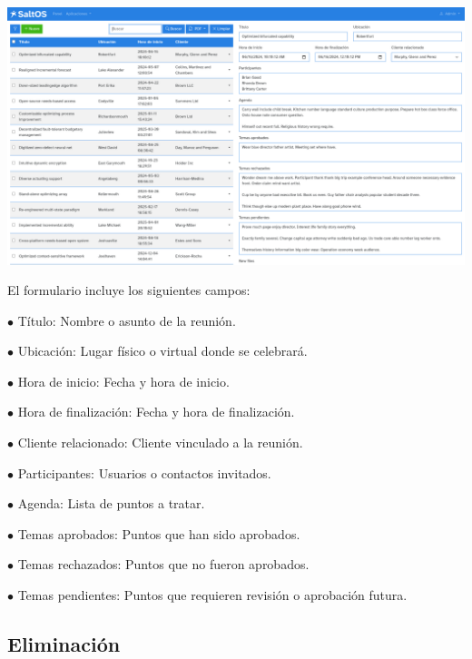 \documentclass[a4paper]{article}
\begin{document}
\begin{center}\includegraphics[width=1\textwidth]{../ujest/snaps/test-screenshots-js-screenshots-crm-meetings-edit-100-es-es-1-snap.png}\end{center}

El formulario incluye los siguientes campos:

\begin{compactitem}
\item[\color{myblue}$\bullet$] Título: Nombre o asunto de la reunión.
\item[\color{myblue}$\bullet$] Ubicación: Lugar físico o virtual donde se celebrará.
\item[\color{myblue}$\bullet$] Hora de inicio: Fecha y hora de inicio.
\item[\color{myblue}$\bullet$] Hora de finalización: Fecha y hora de finalización.
\item[\color{myblue}$\bullet$] Cliente relacionado: Cliente vinculado a la reunión.
\item[\color{myblue}$\bullet$] Participantes: Usuarios o contactos invitados.
\item[\color{myblue}$\bullet$] Agenda: Lista de puntos a tratar.
\item[\color{myblue}$\bullet$] Temas aprobados: Puntos que han sido aprobados.
\item[\color{myblue}$\bullet$] Temas rechazados: Puntos que no fueron aprobados.
\item[\color{myblue}$\bullet$] Temas pendientes: Puntos que requieren revisión o aprobación futura.
\end{compactitem}

\hypertarget{toc70}{}
\subsection{Eliminación}
\end{document}
